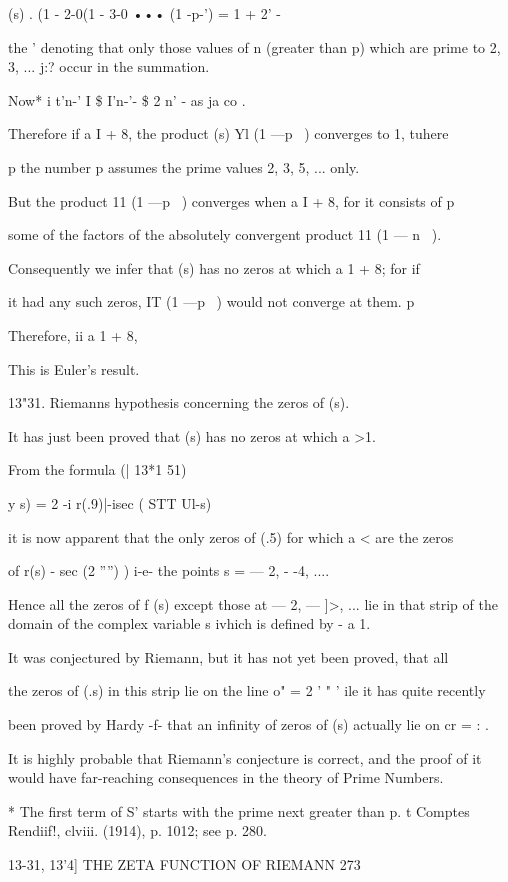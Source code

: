  (s) . (1 - 2-0(1 - 3-0 ••• (1 -p-') = 1 + 2' -

the ' denoting that only those values of n (greater than p) which are
prime to 2, 3, ... j:? occur in the summation.

Now* i t'n-' I \$ I'n-'- \$ 2 n' - as ja co .

Therefore if a I + 8, the product (s) Yl (1 —p~ ) converges to 1,
tuhere

p the number p assumes the prime values 2, 3, 5, ... only.

But the product 11 (1 —p~ ) converges when a I + 8, for it consists of
p

some of the factors of the absolutely convergent product 11 (1 — n~ ).

Consequently we infer that (s) has no zeros at which a 1 + 8; for if

it had any such zeros, IT (1 —p~ ) would not converge at them. p

Therefore, ii a 1 + 8,

This is Euler's result.

13"31. Riemanns hypothesis concerning the zeros of (s).

It has just been proved that (s) has no zeros at which a >1.

From the formula (| 13*1 51)

y s) = 2 -i r(.9)|-isec ( STT Ul-s)

it is now apparent that the only zeros of (.5) for which a < are the
zeros

of r(s) - sec (2 '''') ) i-e- the points s = — 2, - -4, ....

Hence all the zeros of f (s) except those at — 2, — ]>, ... lie in
that strip of the domain of the complex variable s ivhich is defined
by - a 1.

It was conjectured by Riemann, but it has not yet been proved, that
all

the zeros of (.s) in this strip lie on the line o" = 2 ' " ' ile it
has quite recently

been proved by Hardy -f- that an infinity of zeros of (s) actually lie
on cr = : .

It is highly probable that Riemann's conjecture is correct, and the
proof of it would have far-reaching consequences in the theory of
Prime Numbers.

* The first term of S' starts with the prime next greater than p. t
Comptes Rendiif!, clviii. (1914), p. 1012; see p. 280.

13-31, 13'4] THE ZETA FUNCTION OF RIEMANN 273


